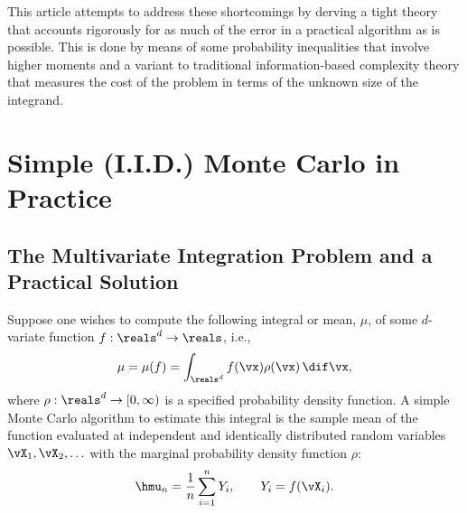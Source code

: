 \documentclass[graybox]{svmult}
\begin{document}
This article attempts to address these shortcomings by derving a tight theory that accounts rigorously for as much of the error in a practical algorithm as is possible.  This is done by means of some probability inequalities that involve higher moments and a variant to traditional information-based complexity theory that measures the cost of the problem in terms of the unknown size of the integrand.  

\section{Simple (I.I.D.) Monte Carlo in Practice}

\subsection{The Multivariate Integration Problem and a Practical Solution}  Suppose one wishes to compute the following integral or mean, $\mu$, of some $d$-variate function $f: \reals^d \to \reals$, i.e.,
\begin{equation*} 
\mu= \mu(f) = \int_{\reals^d} f(\vx) \rho(\vx) \, \dif \vx,
\end{equation*}
where $\rho: \reals^d \to [0,\infty)$ is a specified probability density function.  A simple Monte Carlo algorithm to estimate this integral is the sample mean of the function evaluated at independent and identically distributed random variables $\vX_1, \vX_2, \ldots$ with the marginal probability density function $\rho$:
\begin{equation} \label{samplemean}
\hmu_n = \frac 1n \sum_{i=1}^n Y_i, \qquad Y_i = f(\vX_i).
\end{equation}
\end{document}
